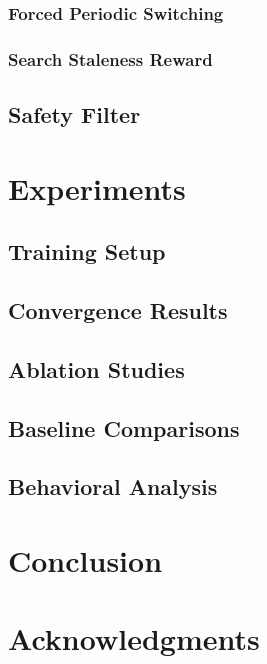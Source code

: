 \documentclass[letterpaper, 10 pt, conference]{ieeeconf}
\begin{document}
\subsubsection{Forced Periodic Switching}

\subsubsection{Search Staleness Reward}

\subsection{Safety Filter}

\section{Experiments}
\label{sec:experiments}

\subsection{Training Setup}

\subsection{Convergence Results}

\subsection{Ablation Studies}

\subsection{Baseline Comparisons}

\subsection{Behavioral Analysis}

\section{Conclusion}
\label{sec:conclusion}

\section*{Acknowledgments}



\end{document}
